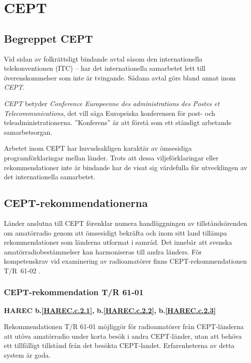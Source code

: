 \section{CEPT}

\subsection{Begreppet CEPT}

Vid sidan av folkrättsligt bindande avtal såsom den internationella
telekonventionen (ITC) -- har det internationella samarbetet lett till
överenskommelser som inte är tvingande.
Sådana avtal görs bland annat inom \emph{CEPT}.

\emph{CEPT} betyder \emph{Conference Europeenne des administrations des
	Postes et Telecommunications}, det vill säga Europeiska konferensen
för post- och teleadministrationerna. ''Konferens'' är att förstå som
ett ständigt arbetande samarbetsorgan.

Arbetet inom CEPT har huvudsakligen karaktär av ömsesidiga programförklaringar
mellan länder.
Trots att dessa viljeförklaringar eller rekommendationer inte är bindande har de
visat sig värdefulla för utvecklingen av det internationella samarbetet.

\subsection{CEPT-rekommendationerna}

Länder anslutna till CEPT förenklar numera handläggningen av
tillståndsärenden om amatörradio genom att ömsesidigt bekräfta och
inom sitt land tillämpa rekommendationer som länderna utformat i
samråd.
Det innebär att svenska amatörradiobestämmelser kan harmoniseras till andra
länders.
För kompetenskrav vid examinering av radioamatörer finns CEPT-rekommendationen
T/R~61-02 \cite{TR6102}.

\subsubsection{CEPT-rekommendation T/R 61-01}
\textbf{
HAREC b.\ref{HAREC.c.2.1}\label{myHAREC.c.2.1},
 b.\ref{HAREC.c.2.2}\label{myHAREC.c.2.2},
 b.\ref{HAREC.c.2.3}\label{myHAREC.c.2.3}
}

Rekommendationen T/R 61-01 \cite{TR6101} möjliggör för radioamatörer från
CEPT-länderna att utöva amatörradio under korta besök i andra CEPT-länder, utan
att behöva ett tillfälligt tillstånd från det besökta CEPT-landet.
Erfarenheterna av detta system är goda.

